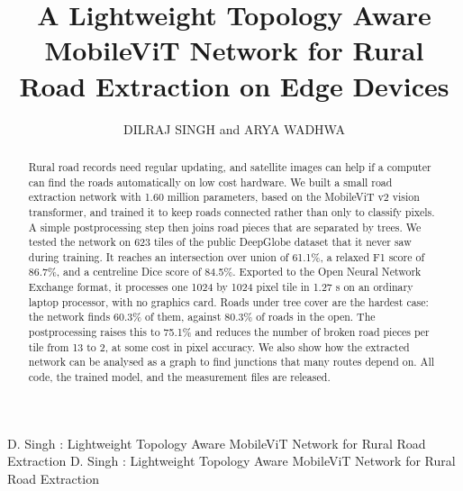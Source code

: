 \documentclass{ieeeaccess}
\begin{document}

\title{A Lightweight Topology Aware MobileViT Network for Rural Road Extraction on Edge Devices}

\author{\uppercase{Dilraj Singh} and
\uppercase{Arya Wadhwa}}

\address[1]{Department of Computer Science and Engineering (Artificial Intelligence and Machine Learning), R. V. College of Engineering, Bengaluru 560059, India (e-mail: dilrajsingh.ai24@rvce.edu.in; aryawadhwa.ai24@rvce.edu.in)}


\markboth
{D. Singh \headeretal: Lightweight Topology Aware MobileViT Network for Rural Road Extraction}
{D. Singh \headeretal: Lightweight Topology Aware MobileViT Network for Rural Road Extraction}


\begin{abstract}
Rural road records need regular updating, and satellite images can help if a computer can find the roads automatically on low cost hardware. We built a small road extraction network with 1.60 million parameters, based on the MobileViT v2 vision transformer, and trained it to keep roads connected rather than only to classify pixels. A simple postprocessing step then joins road pieces that are separated by trees. We tested the network on 623 tiles of the public DeepGlobe dataset that it never saw during training. It reaches an intersection over union of 61.1\%, a relaxed F1 score of 86.7\%, and a centreline Dice score of 84.5\%. Exported to the Open Neural Network Exchange format, it processes one 1024 by 1024 pixel tile in 1.27 s on an ordinary laptop processor, with no graphics card. Roads under tree cover are the hardest case: the network finds 60.3\% of them, against 80.3\% of roads in the open. The postprocessing raises this to 75.1\% and reduces the number of broken road pieces per tile from 13 to 2, at some cost in pixel accuracy. We also show how the extracted network can be analysed as a graph to find junctions that many routes depend on. All code, the trained model, and the measurement files are released.
\end{abstract}
\end{document}
